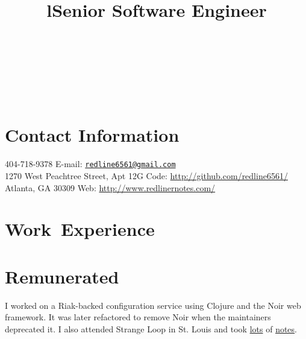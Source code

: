 \documentclass[margintitle,line]{res}
\renewcommand{\subsection}[1]{\section{\normalfont #1}}
\begin{document}

\begin{resume}

\begin{format}
\\
\title{l}\\
\body\\
\end{format}



\section{Contact Information}

404-718-9378 \hfill {E-mail:} \href{mailto:redline6561@gmail.com}{\nolinkurl{redline6561@gmail.com}} \\
1270 West Peachtree Street, Apt 12G \hfill {Code:} \url{http://github.com/redline6561/} \\
Atlanta, GA 30309 \hfill {Web:} \url{http://www.redlinernotes.com/} \\


\section{\mbox{Work Experience}}

\subsection{Remunerated}

\title{Senior Software Engineer}
\begin{position}
  I worked on a Riak-backed configuration service using Clojure and the Noir web framework. It was later
  refactored to remove Noir when the maintainers deprecated it. I also attended Strange Loop
  in St. Louis and took \href{http://blog.redlinernotes.com/posts/Strange-Loop-Notes---Day-2.html}{lots}
  of \href{http://blog.redlinernotes.com/posts/Strange-Loop-Notes---Day-1.html}{notes}.
\end{position}


\end{resume}
\end{document}
